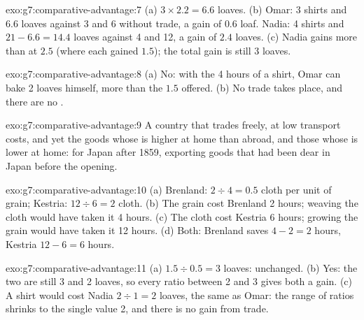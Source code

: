 \begin{solution}{exo:g7:comparative-advantage:7}
(a) $3 \times 2.2 = 6.6$ loaves. (b) Omar: 3 shirts and $6.6$ loaves against 3 and 6
without trade, a gain of $0.6$ loaf. Nadia: 4 shirts and $21 - 6.6 = 14.4$ loaves against
4 and 12, a gain of $2.4$ loaves. (c) Nadia gains more than at $2.5$ (where each gained
$1.5$); the total gain is still 3 loaves.
\end{solution}

\begin{solution}{exo:g7:comparative-advantage:8}
(a) No: with the 4 hours of a shirt, Omar can bake 2 loaves himself, more than the $1.5$
offered. (b) No trade takes place, and there are no .
\end{solution}

\begin{solution}{exo:g7:comparative-advantage:9}
A country that trades freely, at low transport costs, and yet  the goods whose
 is higher at home than abroad, and  those whose 
is lower at home: for Japan after 1859, exporting goods that had been dear in Japan
before the opening.
\end{solution}

\begin{solution}{exo:g7:comparative-advantage:10}
(a) Brenland: $2 \div 4 = 0.5$ cloth per unit of grain; Kestria: $12 \div 6 = 2$ cloth.
(b) The grain cost Brenland 2 hours; weaving the cloth would have taken it 4 hours.
(c) The cloth cost Kestria 6 hours; growing the grain would have taken it 12 hours.
(d) Both: Brenland saves $4 - 2 = 2$ hours, Kestria $12 - 6 = 6$ hours.
\end{solution}

\begin{solution}{exo:g7:comparative-advantage:11}
(a) $1.5 \div 0.5 = 3$ loaves: unchanged. (b) Yes: the two  are still
3 and 2 loaves, so every ratio between 2 and 3 gives both a gain. (c) A shirt would cost
Nadia $2 \div 1 = 2$ loaves, the same as Omar: the range of ratios shrinks to the single
value 2, and there is no gain from trade.
\end{solution}

